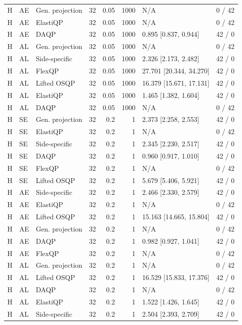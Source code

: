 \begin{longtable}{@{}lllrrrlr@{}}
H & AE & Gen. projection & 32 & 0.05 & 1000 & N/A & 0 / 42 \\
H & AE & ElastiQP & 32 & 0.05 & 1000 & N/A & 0 / 42 \\
H & AE & DAQP & 32 & 0.05 & 1000 & 0.895 [0.837, 0.944] & 42 / 0 \\
H & AL & Gen. projection & 32 & 0.05 & 1000 & N/A & 0 / 42 \\
H & AL & Side-specific & 32 & 0.05 & 1000 & 2.326 [2.173, 2.482] & 42 / 0 \\
H & AL & FlexQP & 32 & 0.05 & 1000 & 27.701 [20.344, 34.270] & 42 / 0 \\
H & AL & Lifted OSQP & 32 & 0.05 & 1000 & 16.379 [15.671, 17.131] & 42 / 0 \\
H & AL & ElastiQP & 32 & 0.05 & 1000 & 1.465 [1.382, 1.604] & 42 / 0 \\
H & AL & DAQP & 32 & 0.05 & 1000 & N/A & 0 / 42 \\
H & SE & Gen. projection & 32 & 0.2 & 1 & 2.373 [2.258, 2.553] & 42 / 0 \\
H & SE & ElastiQP & 32 & 0.2 & 1 & N/A & 0 / 42 \\
H & SE & Side-specific & 32 & 0.2 & 1 & 2.345 [2.230, 2.517] & 42 / 0 \\
H & SE & DAQP & 32 & 0.2 & 1 & 0.960 [0.917, 1.010] & 42 / 0 \\
H & SE & FlexQP & 32 & 0.2 & 1 & N/A & 0 / 42 \\
H & SE & Lifted OSQP & 32 & 0.2 & 1 & 5.679 [5.406, 5.921] & 42 / 0 \\
H & AE & Side-specific & 32 & 0.2 & 1 & 2.466 [2.330, 2.579] & 42 / 0 \\
H & AE & ElastiQP & 32 & 0.2 & 1 & N/A & 0 / 42 \\
H & AE & Lifted OSQP & 32 & 0.2 & 1 & 15.163 [14.665, 15.804] & 42 / 0 \\
H & AE & Gen. projection & 32 & 0.2 & 1 & N/A & 0 / 42 \\
H & AE & DAQP & 32 & 0.2 & 1 & 0.982 [0.927, 1.041] & 42 / 0 \\
H & AE & FlexQP & 32 & 0.2 & 1 & N/A & 0 / 42 \\
H & AL & Gen. projection & 32 & 0.2 & 1 & N/A & 0 / 42 \\
H & AL & Lifted OSQP & 32 & 0.2 & 1 & 16.529 [15.833, 17.376] & 42 / 0 \\
H & AL & DAQP & 32 & 0.2 & 1 & N/A & 0 / 42 \\
H & AL & ElastiQP & 32 & 0.2 & 1 & 1.522 [1.426, 1.645] & 42 / 0 \\
H & AL & Side-specific & 32 & 0.2 & 1 & 2.504 [2.393, 2.709] & 42 / 0 \\

\end{longtable}
